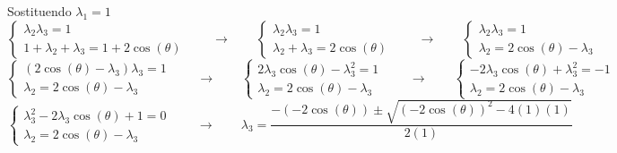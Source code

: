 \documentclass[11pt, a4paper]{report}
\begin{document}
Sostituendo \( \lambda_{1} = 1 \)
\[
    \begin{cases}
        \lambda_{2}\lambda_{3} = 1\\
        1 + \lambda_{2} + \lambda_{3} = 1 + 2\cos(\theta)
    \end{cases}
    \qquad\longrightarrow\qquad
    \begin{cases}
        \lambda_{2}\lambda_{3} = 1\\
        \lambda_{2} + \lambda_{3} = 2\cos(\theta)
    \end{cases}
    \qquad\longrightarrow\qquad
    \begin{cases}
        \lambda_{2}\lambda_{3} = 1\\
        \lambda_{2} = 2\cos(\theta) - \lambda_{3}
    \end{cases}
\]
\[
    \begin{cases}
        (2\cos(\theta) - \lambda_{3})\lambda_{3} = 1\\
        \lambda_{2} = 2\cos(\theta) - \lambda_{3}
    \end{cases}
    \qquad\longrightarrow\qquad
    \begin{cases}
        2\lambda_{3}\cos(\theta) - \lambda_{3}^{2} = 1\\
        \lambda_{2} = 2\cos(\theta) - \lambda_{3}
    \end{cases}
    \qquad\longrightarrow\qquad
    \begin{cases}
        -2\lambda_{3}\cos(\theta) + \lambda_{3}^{2} = -1\\
        \lambda_{2} = 2\cos(\theta) - \lambda_{3}
    \end{cases}
\]
\[
    \begin{cases}
        \lambda_{3}^{2} - 2\lambda_{3}\cos(\theta) + 1  = 0\\
        \lambda_{2} = 2\cos(\theta) - \lambda_{3}
    \end{cases}
    \qquad\longrightarrow\qquad
    \lambda_{3} = \frac{-(-2\cos(\theta)) \pm \sqrt{(-2\cos(\theta))^2 - 4(1)(1)}}{2(1)}
\]
\end{document}
